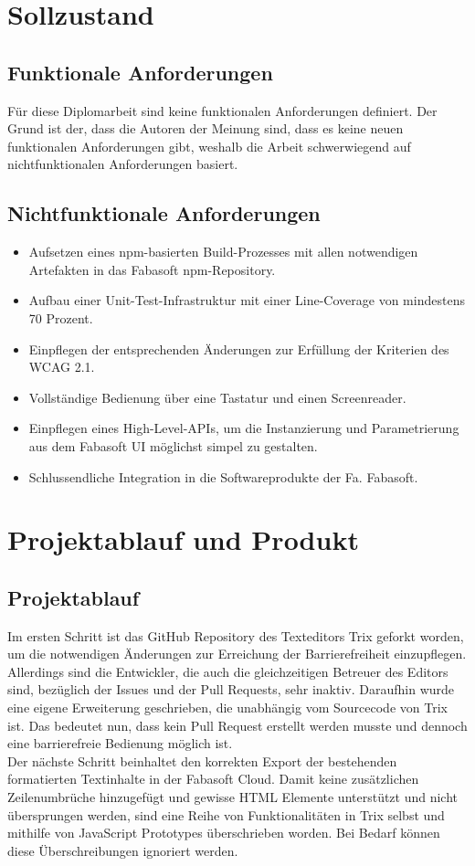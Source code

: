 \section{Sollzustand}

\subsection{Funktionale Anforderungen}
Für diese Diplomarbeit sind keine funktionalen Anforderungen definiert. Der Grund ist der, dass die Autoren der Meinung sind, dass es keine neuen funktionalen Anforderungen gibt, weshalb die Arbeit schwerwiegend auf nichtfunktionalen Anforderungen basiert.

\subsection{Nichtfunktionale Anforderungen}

\begin{itemize}
	\item Aufsetzen eines npm-basierten Build-Prozesses mit allen notwendigen Artefakten in das Fabasoft npm-Repository.
	\item Aufbau einer Unit-Test-Infrastruktur mit einer Line-Coverage von mindestens 70 Prozent.
	\item Einpflegen der entsprechenden Änderungen zur Erfüllung der Kriterien des WCAG 2.1.
	\item Vollständige Bedienung über eine Tastatur und einen Screenreader.
	\item Einpflegen eines High-Level-APIs, um die Instanzierung und Parametrierung aus dem Fabasoft UI möglichst simpel zu gestalten.
	\item Schlussendliche Integration in die Softwareprodukte der Fa. Fabasoft.
\end{itemize}

\section{Projektablauf und Produkt}
\subsection{Projektablauf}
Im ersten Schritt ist das GitHub Repository des Texteditors Trix geforkt worden, um die notwendigen Änderungen zur Erreichung der Barrierefreiheit einzupflegen. Allerdings sind die Entwickler, die auch die gleichzeitigen Betreuer des Editors sind, bezüglich der Issues und der Pull Requests, sehr inaktiv. Daraufhin wurde eine eigene Erweiterung geschrieben, die unabhängig vom Sourcecode von Trix ist. Das bedeutet nun, dass kein Pull Request erstellt werden musste und dennoch eine barrierefreie Bedienung möglich ist.\\
Der nächste Schritt beinhaltet den korrekten Export der bestehenden formatierten Textinhalte in der Fabasoft Cloud. Damit keine zusätzlichen Zeilenumbrüche hinzugefügt und gewisse HTML Elemente unterstützt und nicht übersprungen werden, sind eine Reihe von Funktionalitäten in Trix selbst und mithilfe von JavaScript Prototypes überschrieben worden. Bei Bedarf können diese Überschreibungen ignoriert werden.

